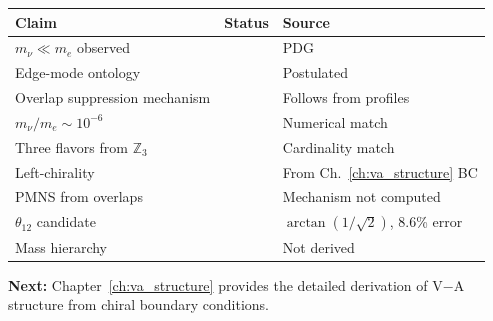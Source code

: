 \begin{tcolorbox}[colback=orange!5, colframe=orange!50!black,
    title=\textbf{Epistemic Audit: Chapter 9}]
\begin{center}
\begin{tabular}{lll}
\toprule
\textbf{Claim} & \textbf{Status} & \textbf{Source} \\
\midrule
$m_\nu \ll m_e$ observed & \tagBL{} & PDG \\
Edge-mode ontology & \tagP{} & Postulated \\
Overlap suppression mechanism & \tagDc{} & Follows from profiles \\
$m_\nu/m_e \sim 10^{-6}$ & \tagI{} & Numerical match \\
Three flavors from $\mathbb{Z}_3$ & \tagI{} & Cardinality match \\
Left-chirality & \tagDc{} & From Ch.~\ref{ch:va_structure} BC \\
PMNS from overlaps & \tagP{} & Mechanism not computed \\
$\theta_{12}$ candidate & \tagDcApprox{} & $\arctan(1/\sqrt{2})$, 8.6\% error \\
Mass hierarchy & \tagOpen{} & Not derived \\
\bottomrule
\end{tabular}
\end{center}
\end{tcolorbox}

\textbf{Next:} Chapter~\ref{ch:va_structure} provides the detailed derivation
of V$-$A structure from chiral boundary conditions.

